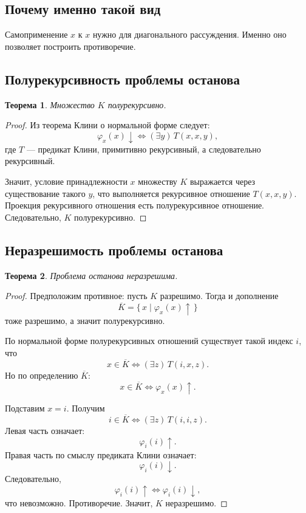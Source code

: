 \documentclass[12pt,a4paper]{article}
\newtheorem{theorem}{Теорема}
\begin{document}
\subsection{Почему именно такой вид}
Самоприменение $x$ к $x$ нужно для диагонального рассуждения. Именно оно позволяет построить противоречие.

\subsection{Полурекурсивность проблемы останова}
\begin{theorem}
Множество $K$ полурекурсивно.
\end{theorem}

\begin{proof}
Из теорема Клини о нормальной форме следует:
\[
\varphi_x(x)\downarrow \iff (\exists y)\,T(x,x,y),
\]
где $T$ --- предикат Клини, примитивно рекурсивный, а следовательно рекурсивный.

Значит, условие принадлежности $x$ множеству $K$ выражается через существование такого $y$, что выполняется рекурсивное отношение $T(x,x,y)$. Проекция рекурсивного отношения есть полурекурсивное отношение. Следовательно, $K$ полурекурсивно.
\end{proof}

\subsection{Неразрешимость проблемы останова}
\begin{theorem}
Проблема останова неразрешима.
\end{theorem}

\begin{proof}
Предположим противное: пусть $K$ разрешимо. Тогда и дополнение
\[
\overline K=\{\,x\mid \varphi_x(x)\uparrow\,\}
\]
тоже разрешимо, а значит полурекурсивно.

По нормальной форме полурекурсивных отношений существует такой индекс $i$, что
\[
x\in \overline K \iff (\exists z)\,T(i,x,z).
\]
Но по определению $\overline K$:
\[
x\in \overline K \iff \varphi_x(x)\uparrow.
\]

Подставим $x=i$. Получим
\[
i\in \overline K \iff (\exists z)\,T(i,i,z).
\]
Левая часть означает:
\[
\varphi_i(i)\uparrow.
\]
Правая часть по смыслу предиката Клини означает:
\[
\varphi_i(i)\downarrow.
\]
Следовательно,
\[
\varphi_i(i)\uparrow \iff \varphi_i(i)\downarrow,
\]
что невозможно. Противоречие. Значит, $K$ неразрешимо.
\end{proof}
\end{document}
